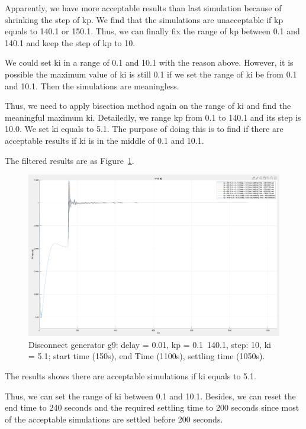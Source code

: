 Apparently, we have more acceptable results than last simulation because of shrinking the step of kp. We find that the simulations are unacceptable if kp equals to 140.1 or 150.1. Thus, we can finally fix the range of kp between 0.1 and 140.1 and keep the step of kp to 10.  

We could set ki in a range of 0.1 and 10.1 with the reason above. However, it is possible the maximum value of ki is still 0.1 if we set the range of ki be from 0.1 and 10.1. Then the simulations are meaningless.  

Thus, we need to apply bisection method again on the range of ki and find the meaningful maximum ki. Detailedly, we range kp from 0.1 to 140.1 and its step is 10.0. We set ki equals to 5.1. The purpose of doing this is to find if there are acceptable results if ki is in the middle of 0.1 and 10.1.    

The filtered results are as Figure~\ref{4_1_2_c}.  

\begin{figure}[htbp]
\centering
\includegraphics[width = .819\textwidth]{figure/4_1_2_c.png}
\caption{Disconnect generator g9: delay = 0.01, kp = 0.1~140.1, step: 10, ki = 5.1; start time (150s), end Time (1100s), settling time (1050s).}
\label{4_1_2_c}
\end{figure}

The results shows there are acceptable simulations if ki equals to 5.1.  

Thus, we can set the range of ki between 0.1 and 10.1. 
Besides, we can reset the end time to 240 seconds and the required settling time to 200 seconds since most of the acceptable simulations are settled before 200 seconds. 
